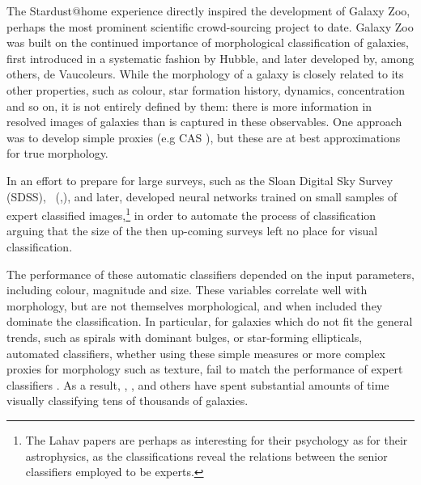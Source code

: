 \documentclass{ar2e}
\def\CaseStudy#1{\noindent{\it\bf #1 \,\,\,\,}}
\begin{document}


\CaseStudy{Galaxy morphology with Galaxy Zoo}  

The Stardust@home experience directly inspired the development of Galaxy Zoo,
perhaps the most prominent scientific crowd-sourcing project to date. Galaxy Zoo
was built on the continued importance of morphological classification of
galaxies, first introduced in a systematic fashion by Hubble, and later
developed by, among others, de Vaucoleurs.  While the morphology of a galaxy is
closely related to its other properties, such as colour, star formation history,
dynamics, concentration and so on, it is not entirely defined by them: there is
more information in resolved images of galaxies than is captured in these
observables.  One approach was to develop simple proxies (e.g CAS \citep{Conselice}), but these
are at best approximations for true morphology. 

In an effort to prepare for large surveys, such as the Sloan
Digital Sky Survey (SDSS),
\citeauthor{Lahav1995}~(\citeyear{Lahav1995},\citeyear{Lahav1996}), and later,
\citet{Ball} developed neural networks trained on small samples of expert
classified images,\footnote{The Lahav papers are perhaps as interesting for
their psychology as for their astrophysics, as the classifications reveal the
relations between the senior classifiers employed to be experts.} in order to
automate the process of classification arguing that the size of the then
up-coming surveys left no place for visual classification.

The performance of these automatic classifiers depended on the input parameters,
including colour, magnitude and size. These variables correlate well with
morphology, but are not themselves morphological, and when included they
dominate the classification. In particular, for galaxies which do not fit the
general trends, such as spirals with dominant bulges, or star-forming
ellipticals, automated classifiers, whether using these simple measures or
more complex proxies for morphology such as texture, fail to match the
performance of expert classifiers \citep{Lin++2008}. 
As a result, \citet{Scha2007},
\citet{Nair}, and others have spent substantial amounts of time visually
classifying tens of thousands of galaxies. 
\end{document}
